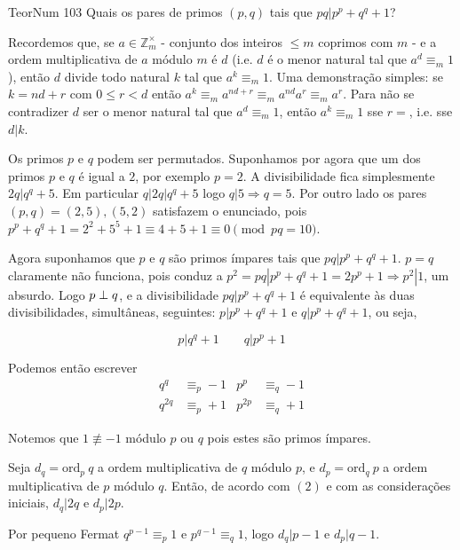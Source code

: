 \documentclass[repertorio-solutions-1.tex]{subfiles}
\renewcommand*{\ord}[1]{\ensuremath{\text{ord}_#1\:}}
\begin{document}
\begin{problem}{TeorNum 103}
Quais os pares de primos $(p,q)$ tais que $pq|p^p+q^q+1$?
\end{problem}

\begin{solution}
\begin{note}
Recordemos que, se $a\in\mathbb{Z}_m^\times$ - conjunto dos inteiros $\leq m$ coprimos com $m$ - e a ordem multiplicativa de $a$ módulo $m$ é $d$ (i.e. $d$ é o menor natural tal que $a^d\equiv_m 1$), então $d$ divide todo natural $k$ tal que $a^k\equiv_m 1$.
Uma demonstração simples: se $k=nd+r$ com $0\leq r<d$ então
$a^k\equiv_m a^{nd+r}\equiv_ma^{nd}a^r\equiv_ma^r$. Para não se contradizer $d$ ser o menor natural tal que $a^d\equiv_m 1$, então $a^k\equiv_m 1$ sse $r=$, i.e. sse $d|k$.
\end{note}

Os primos $p$ e $q$ podem ser permutados. Suponhamos por agora que um dos primos $p$ e $q$ é igual a $2$, por exemplo $p=2$. A divisibilidade fica simplesmente $2q|q^q+5$. Em particular $q|2q|q^q+5$ logo $q|5\Rightarrow q=5$.
Por outro lado os pares $(p,q)=(2,5),(5,2)$ satisfazem o enunciado, pois
$p^p+q^q+1=2^2+5^5+1\equiv 4+5+1\equiv 0\pmod{pq=10}$.

Agora suponhamos que $p$ e $q$ são primos ímpares tais que $pq|p^p+q^q+1$.
$p=q$ claramente não funciona, pois conduz a $p^2=pq|p^p+q^q+1=2p^p+1\Rightarrow p^2|1$, um absurdo.
Logo $p\perp q$, e a divisibilidade $pq|p^p+q^q+1$ é equivalente às duas divisibilidades, simultâneas, seguintes:
$p|p^p+q^q+1$ e $q|p^p+q^q+1$, ou seja,

\begin{equation*}
p|q^q+1 \qquad q|p^p+1
\end{equation*}

Podemos então escrever
\begin{align}
q^q&\equiv_p -1 & p^p&\equiv_q -1\\
q^{2q}&\equiv_p +1 & p^{2p}&\equiv_q +1
\end{align}

Notemos que $1\not\equiv -1$ módulo $p$ ou $q$ pois estes são primos ímpares.

Seja $d_q=\ord{p} q$ a ordem multiplicativa de $q$ módulo $p$,
e $d_p=\ord{q} p$ a ordem multiplicativa de $p$ módulo $q$.
Então, de acordo com $(2)$ e com as considerações iniciais, $d_q|2q$ e $d_p|2p$.

Por pequeno Fermat $q^{p-1}\equiv_p 1$ e $p^{q-1}\equiv_q 1$,
logo $d_q|p-1$ e $d_p|q-1$.


\end{solution}
\end{document}
